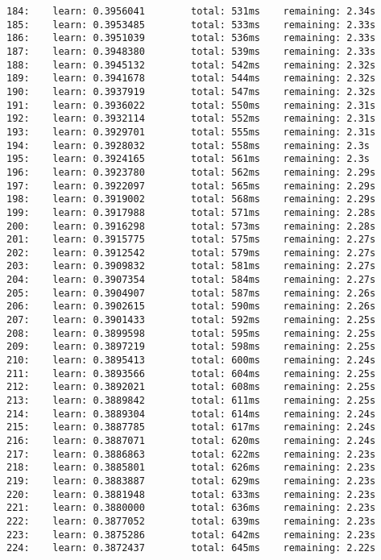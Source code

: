 \documentclass[11pt]{article}
\begin{document}
\begin{Verbatim}[commandchars=\\\{\}]
184:    learn: 0.3956041        total: 531ms    remaining: 2.34s
185:    learn: 0.3953485        total: 533ms    remaining: 2.33s
186:    learn: 0.3951039        total: 536ms    remaining: 2.33s
187:    learn: 0.3948380        total: 539ms    remaining: 2.33s
188:    learn: 0.3945132        total: 542ms    remaining: 2.32s
189:    learn: 0.3941678        total: 544ms    remaining: 2.32s
190:    learn: 0.3937919        total: 547ms    remaining: 2.32s
191:    learn: 0.3936022        total: 550ms    remaining: 2.31s
192:    learn: 0.3932114        total: 552ms    remaining: 2.31s
193:    learn: 0.3929701        total: 555ms    remaining: 2.31s
194:    learn: 0.3928032        total: 558ms    remaining: 2.3s
195:    learn: 0.3924165        total: 561ms    remaining: 2.3s
196:    learn: 0.3923780        total: 562ms    remaining: 2.29s
197:    learn: 0.3922097        total: 565ms    remaining: 2.29s
198:    learn: 0.3919002        total: 568ms    remaining: 2.29s
199:    learn: 0.3917988        total: 571ms    remaining: 2.28s
200:    learn: 0.3916298        total: 573ms    remaining: 2.28s
201:    learn: 0.3915775        total: 575ms    remaining: 2.27s
202:    learn: 0.3912542        total: 579ms    remaining: 2.27s
203:    learn: 0.3909832        total: 581ms    remaining: 2.27s
204:    learn: 0.3907354        total: 584ms    remaining: 2.27s
205:    learn: 0.3904907        total: 587ms    remaining: 2.26s
206:    learn: 0.3902615        total: 590ms    remaining: 2.26s
207:    learn: 0.3901433        total: 592ms    remaining: 2.25s
208:    learn: 0.3899598        total: 595ms    remaining: 2.25s
209:    learn: 0.3897219        total: 598ms    remaining: 2.25s
210:    learn: 0.3895413        total: 600ms    remaining: 2.24s
211:    learn: 0.3893566        total: 604ms    remaining: 2.25s
212:    learn: 0.3892021        total: 608ms    remaining: 2.25s
213:    learn: 0.3889842        total: 611ms    remaining: 2.25s
214:    learn: 0.3889304        total: 614ms    remaining: 2.24s
215:    learn: 0.3887785        total: 617ms    remaining: 2.24s
216:    learn: 0.3887071        total: 620ms    remaining: 2.24s
217:    learn: 0.3886863        total: 622ms    remaining: 2.23s
218:    learn: 0.3885801        total: 626ms    remaining: 2.23s
219:    learn: 0.3883887        total: 629ms    remaining: 2.23s
220:    learn: 0.3881948        total: 633ms    remaining: 2.23s
221:    learn: 0.3880000        total: 636ms    remaining: 2.23s
222:    learn: 0.3877052        total: 639ms    remaining: 2.23s
223:    learn: 0.3875286        total: 642ms    remaining: 2.23s
224:    learn: 0.3872437        total: 645ms    remaining: 2.22s

\end{Verbatim}
\end{document}
